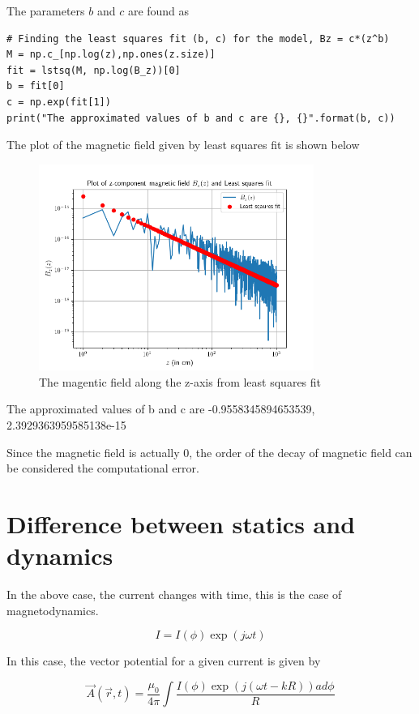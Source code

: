 \documentclass[12pt, a4paper]{article}
\begin{document}
The parameters $b$ and $c$ are found as

\begin{lstlisting}
# Finding the least squares fit (b, c) for the model, Bz = c*(z^b)
M = np.c_[np.log(z),np.ones(z.size)]
fit = lstsq(M, np.log(B_z))[0]
b = fit[0]
c = np.exp(fit[1])
print("The approximated values of b and c are {}, {}".format(b, c))
\end{lstlisting}

The plot of the magnetic field given by least squares fit is shown below

\begin{figure}[H]
\centering
\includegraphics[width=0.8\textwidth]{Bzcosfit.png}
\caption{The magentic field along the z-axis from least squares fit}
\end{figure}

The approximated values of b and c are -0.9558345894653539, 2.3929363959585138e-15

Since the magnetic field is actually 0, the order of the decay of magnetic field can be considered the computational error.

\section{Difference between statics and dynamics}

In the above case, the current changes with time, this is the case of magnetodynamics.

\begin{equation*}
I = I(\phi)\exp(j\omega t)
\end{equation*}

In this case, the vector potential for a given current is given by

\begin{equation*}
\vec{A}(\vec{r}, t) = \frac{\mu_0}{4\pi} \int \frac{I(\phi)\exp(j(\omega t-kR))ad\phi}{R}
\end{equation*}
\end{document}
